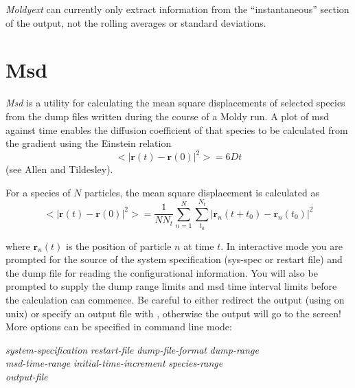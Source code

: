 \documentclass[a4paper,twoside]{report}
\providecommand{\bm}[1]{\mathbf{#1}}
\begin{document}
\emph{Moldyext} can currently only extract information from the
``instantaneous'' section of the output, not the rolling averages or
standard deviations.

\section{Msd}%
\emph{Msd} is a utility for calculating the mean square displacements
of selected species from the dump files written during the course of a
Moldy run. A plot of msd against time enables the diffusion
coefficient of that species to be calculated from the gradient using
the Einstein relation
\begin{equation}
   <|\bm{r}(t)-\bm{r}(0)|^2> = 6 D t
\end{equation}
(see Allen and Tildesley\cite[p60]{allen:87}).

For a species of $N$ particles, the mean square displacement is
calculated as
\begin{equation}  
        <|\bm{r}(t)-\bm{r}(0)|^2> = \frac{1}{N N_t}
        \sum_{n=1}^{N} \sum_{t_0}^{N_t}
        |\bm{r}_n(t+t_0) - \bm{r}_n(t_0)|^2
\end{equation}

where $\bm{r}_n(t)$ is the position of particle $n$ at
time $t$.  In interactive mode you are prompted for the source of the
system specification (sys-spec or restart file) and the dump file for
reading the configurational information. You will also be prompted to
supply the dump range limits and msd time interval limits before the
calculation can commence. Be careful to either redirect the output
(using \Lit{>} on unix) or specify an output file with ,
otherwise the output will go to the screen!  More options can be
specified in command line mode:

\begin{center}
\Lit{[-s} \textit{system-specification} \Lit{|}
 \textit{restart-file}\Lit{]}
\Lit{[-d} \textit{dump-file-format}\Lit{]}
\Lit{[-t} \textit{dump-range}\Lit{]} \\
\Lit{[-m} \textit{msd-time-range}\Lit{]}
\Lit{[-i} \textit{initial-time-increment}\Lit{]}
\Lit{[-g} \textit{species-range}\Lit{]}
\Lit{[-u]}
\Lit{[-w]} \\
\Lit{[-x|-X]} \Lit{[-y|-Y]} \Lit{[-z|-Z]}
\Lit{[-o} \textit{output-file} \Lit{]}
\end{center}
\end{document}
